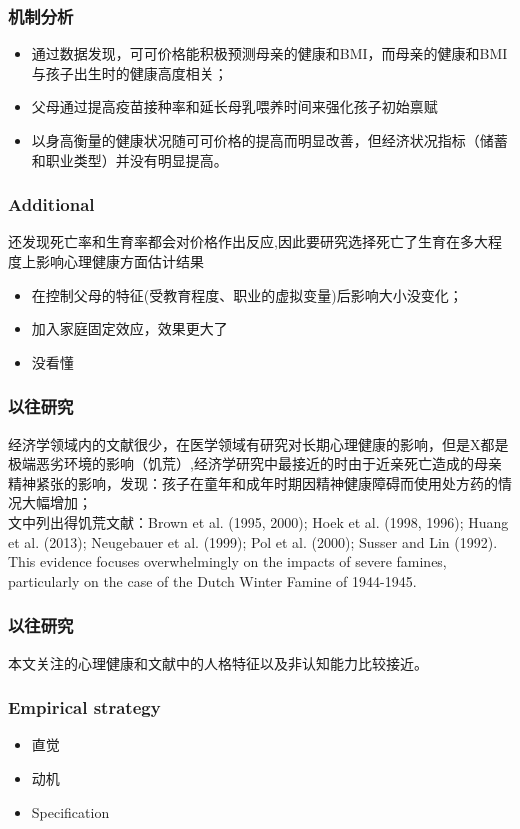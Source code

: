 \documentclass{beamer}
\begin{document}
\begin{frame}
    \frametitle{机制分析}
    \begin{itemize}
    	\item 通过数据发现，可可价格能积极预测母亲的健康和BMI，而母亲的健康和BMI与孩子出生时的健康高度相关；
    	\item 父母通过提高疫苗接种率和延长母乳喂养时间来强化孩子初始禀赋
    	\item 以身高衡量的健康状况随可可价格的提高而明显改善，但经济状况指标（储蓄和职业类型）并没有明显提高。
    \end{itemize}
\end{frame}


\begin{frame}
    \frametitle{Additional}
    还发现死亡率和生育率都会对价格作出反应,因此要研究选择死亡了生育在多大程度上影响心理健康方面估计结果
    \begin{itemize}
    	\item 在控制父母的特征(受教育程度、职业的虚拟变量)后影响大小没变化；
    	\item 加入家庭固定效应，效果更大了
    	\item 没看懂
    \end{itemize}
\end{frame}

\begin{frame}
	\frametitle{以往研究}
	经济学领域内的文献很少，在医学领域有研究对长期心理健康的影响，但是X都是极端恶劣环境的影响（饥荒）,经济学研究中最接近的时由于近亲死亡造成的母亲精神紧张的影响，发现：孩子在童年和成年时期因精神健康障碍而使用处方药的情况大幅增加；
	\\ 文中列出得饥荒文献：Brown et al. (1995, 2000); Hoek et al. (1998, 1996); Huang et al. (2013); Neugebauer et al. (1999); Pol et al. (2000); Susser and Lin (1992). This evidence focuses overwhelmingly on the impacts of severe famines, particularly on the case of the Dutch Winter Famine of 1944-1945.

\end{frame}

\begin{frame}
	\frametitle{以往研究}
	本文关注的心理健康和文献中的人格特征以及非认知能力比较接近。
\end{frame}

\begin{frame}
	\frametitle{Empirical strategy}
	\begin{itemize}
		\item 直觉
		\item 动机
		\item Speciﬁcation
	\end{itemize}
\end{frame}
\end{document}
